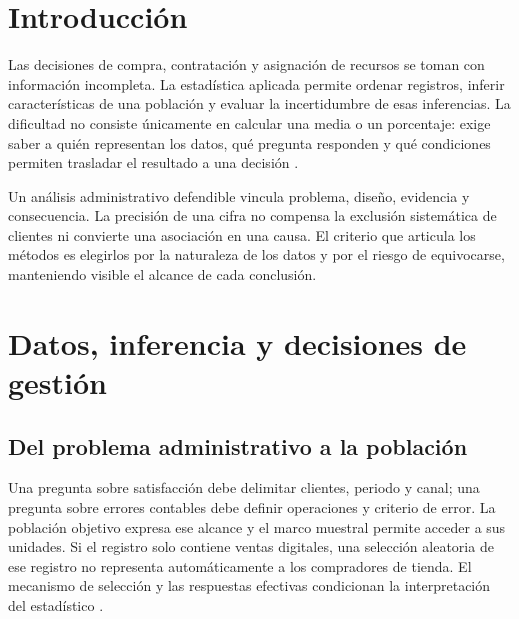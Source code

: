 \documentclass[
	spanish,
	letterpaper, oneside
]{article}
\begin{document}

\templatePagecfg
\onehalfspacing
\templateFinalcfg
\hypersetup{hidelinks}
\justifying
\estadisticapreliminares
\section{Introducción}
Las decisiones de compra, contratación y asignación de recursos se toman con información incompleta. La estadística aplicada permite ordenar registros, inferir características de una población y evaluar la incertidumbre de esas inferencias. La dificultad no consiste únicamente en calcular una media o un porcentaje: exige saber a quién representan los datos, qué pregunta responden y qué condiciones permiten trasladar el resultado a una decisión \citep{holmesBusiness2023}.

Un análisis administrativo defendible vincula problema, diseño, evidencia y consecuencia. La precisión de una cifra no compensa la exclusión sistemática de clientes ni convierte una asociación en una causa. El criterio que articula los métodos es elegirlos por la naturaleza de los datos y por el riesgo de equivocarse, manteniendo visible el alcance de cada conclusión.

\section{Datos, inferencia y decisiones de gestión}
\subsection{Del problema administrativo a la población}
Una pregunta sobre satisfacción debe delimitar clientes, periodo y canal; una pregunta sobre errores contables debe definir operaciones y criterio de error. La población objetivo expresa ese alcance y el marco muestral permite acceder a sus unidades. Si el registro solo contiene ventas digitales, una selección aleatoria de ese registro no representa automáticamente a los compradores de tienda. El mecanismo de selección y las respuestas efectivas condicionan la interpretación del estadístico \citep{holmesBusiness2023,bradley2021}.
\end{document}
